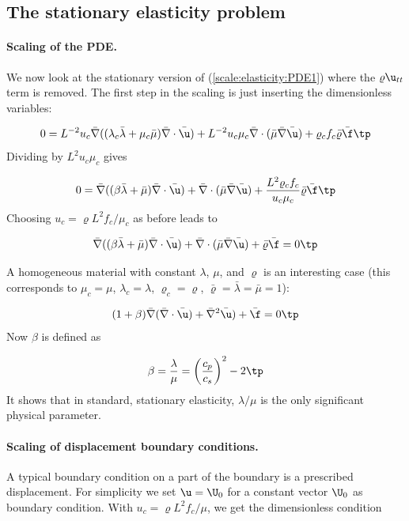 \documentclass[graybox,envcountchap,sectrefs,final]{svmonodo}
\begin{document}
\subsection{The stationary elasticity problem}
\label{scale:elasticity:stationary}

\paragraph{Scaling of the PDE.}
We now look at the stationary version of
(\ref{scale:elasticity:PDE1}) where the $\varrho\u_{tt}$ term is
removed. The first step in the scaling is just inserting the
dimensionless variables:

\[
0 =
L^{-2}u_c\bar \nabla ((\lambda_c\bar\lambda +
\mu_c\bar\mu)\bar \nabla\cdot\bar \u) +
L^{-2}u_c\mu_c\bar \nabla\cdot(\bar \mu\bar \nabla\bar \u) +
\varrho_cf_c\bar\varrho\bar\f\tp
\]
Dividing by $L^2u_c\mu_c$ gives

\[
0 =
\bar \nabla ((\beta\bar\lambda +
\bar\mu)\bar \nabla\cdot\bar \u) +
\bar \nabla\cdot(\bar \mu\bar \nabla\bar \u) +
\frac{L^2\varrho_cf_c}{u_c\mu_c}\bar\varrho\bar\f\tp
\]
Choosing $u_c = \varrho L^2f_c/\mu_c$ as before leads to

\begin{equation}
\bar \nabla ((\beta\bar\lambda +
\bar\mu)\bar \nabla\cdot\bar \u) +
\bar \nabla\cdot(\bar \mu\bar \nabla\bar \u) +
\bar\varrho\bar\f = 0\tp
\end{equation}

A homogeneous material with constant $\lambda$, $\mu$, and $\varrho$
is an interesting case (this corresponds to $\mu_c=\mu$, $\lambda_c=\lambda$,
$\varrho_c=\varrho$, $\bar\varrho=\bar\lambda=\bar\mu=1$):

\begin{equation}
(1+\beta)\bar \nabla(\bar \nabla\cdot\bar \u) +
\bar \nabla^2\bar \u) +
\bar\f = 0\tp
\end{equation}
Now $\beta$ is defined as

\[ \beta = \frac{\lambda}{\mu} = \left(\frac{c_p}{c_s}\right)^2 - 2\tp\]
It shows that in standard, stationary elasticity, $\lambda/\mu$ is the
only significant physical parameter.

\paragraph{Scaling of displacement boundary conditions.}
A typical boundary condition on a part of the boundary is a prescribed
displacement. For simplicity we set $\u = \U_0$ for a constant vector
$\U_0$ as boundary condition. With $u_c=\varrho L^2f_c/\mu$, we get
the dimensionless condition
\end{document}
